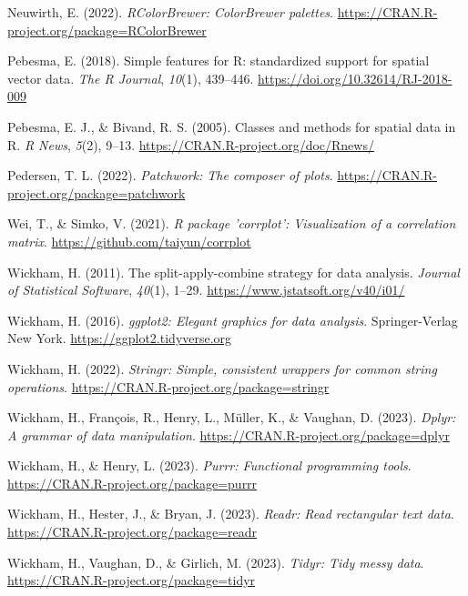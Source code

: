 \documentclass[
]{article}
\newlength{\cslhangindent}
\newlength{\cslentryspacingunit} %
\newenvironment{CSLReferences}[2] %
 {%
  \setlength{\parindent}{0pt}
  \ifodd #1
  \let\oldpar\par
  \def\par{\hangindent=\cslhangindent\oldpar}
  \fi
  \setlength{\parskip}{#2\cslentryspacingunit}
 }%
 {}
\begin{document}
\begin{CSLReferences}{1}{0}
\leavevmode{}%
Neuwirth, E. (2022). \emph{RColorBrewer: ColorBrewer palettes}.
\url{https://CRAN.R-project.org/package=RColorBrewer}

\leavevmode{}%
Pebesma, E. (2018). {Simple features for R: standardized support for
spatial vector data}. \emph{{The R Journal}}, \emph{10}(1), 439--446.
\url{https://doi.org/10.32614/RJ-2018-009}

\leavevmode{}%
Pebesma, E. J., \& Bivand, R. S. (2005). Classes and methods for spatial
data in {R}. \emph{R News}, \emph{5}(2), 9--13.
\url{https://CRAN.R-project.org/doc/Rnews/}

\leavevmode{}%
Pedersen, T. L. (2022). \emph{Patchwork: The composer of plots}.
\url{https://CRAN.R-project.org/package=patchwork}

\leavevmode{}%
Wei, T., \& Simko, V. (2021). \emph{R package 'corrplot': Visualization
of a correlation matrix}. \url{https://github.com/taiyun/corrplot}

\leavevmode{}%
Wickham, H. (2011). The split-apply-combine strategy for data analysis.
\emph{Journal of Statistical Software}, \emph{40}(1), 1--29.
\url{https://www.jstatsoft.org/v40/i01/}

\leavevmode{}%
Wickham, H. (2016). \emph{ggplot2: Elegant graphics for data analysis}.
Springer-Verlag New York. \url{https://ggplot2.tidyverse.org}

\leavevmode{}%
Wickham, H. (2022). \emph{Stringr: Simple, consistent wrappers for
common string operations}.
\url{https://CRAN.R-project.org/package=stringr}

\leavevmode{}%
Wickham, H., François, R., Henry, L., Müller, K., \& Vaughan, D. (2023).
\emph{Dplyr: A grammar of data manipulation}.
\url{https://CRAN.R-project.org/package=dplyr}

\leavevmode{}%
Wickham, H., \& Henry, L. (2023). \emph{Purrr: Functional programming
tools}. \url{https://CRAN.R-project.org/package=purrr}

\leavevmode{}%
Wickham, H., Hester, J., \& Bryan, J. (2023). \emph{Readr: Read
rectangular text data}. \url{https://CRAN.R-project.org/package=readr}

\leavevmode{}%
Wickham, H., Vaughan, D., \& Girlich, M. (2023). \emph{Tidyr: Tidy messy
data}. \url{https://CRAN.R-project.org/package=tidyr}

\end{CSLReferences}
\end{document}
